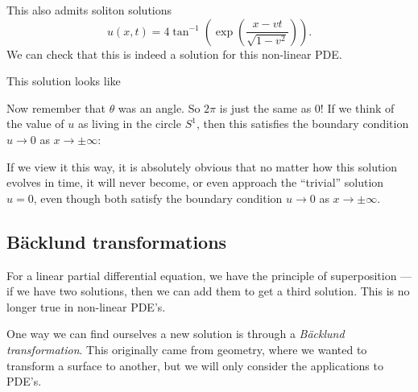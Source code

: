\documentclass[a4paper]{article}
\begin{document}
This also admits soliton solutions
\[
  u(x, t) = 4 \tan^{-1} \left(\exp\left(\frac{x - vt}{\sqrt{1 - v^2}}\right)\right).
\]
We can check that this is indeed a solution for this non-linear PDE.

This solution looks like
\begin{center}
\end{center}
Now remember that $\theta$ was an angle. So $2\pi$ is just the same as $0$! If we think of the value of $u$ as living in the circle $S^1$, then this satisfies the boundary condition $u \to 0$ as $x \to \pm \infty$:
\begin{center}
\end{center}
If we view it this way, it is absolutely obvious that no matter how this solution evolves in time, it will never become, or even approach the ``trivial'' solution $u = 0$, even though both satisfy the boundary condition $u \to 0$ as $x \to \pm \infty$.

\subsection{\texorpdfstring{B\"acklund}{Backlund} transformations}
For a linear partial differential equation, we have the principle of superposition --- if we have two solutions, then we can add them to get a third solution. This is no longer true in non-linear PDE's.

One way we can find ourselves a new solution is through a \emph{B\"acklund transformation}. This originally came from geometry, where we wanted to transform a surface to another, but we will only consider the applications to PDE's.
\end{document}
